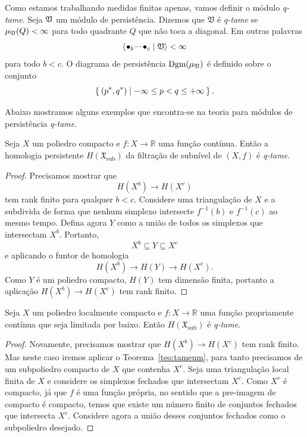 Como estamos trabalhando medidas finitas apenas, vamos definir o módulo \textit{q-tame}. Seja 
$\mathfrak{V}$ um módulo de persistência. Dizemos que $\mathfrak{V}$ é \textit{q-tame} se 
$\mu_{\mathfrak{V}}(Q) < \infty$ para todo quadrante $Q$ que não toca a diagonal. Em outras palavras
\begin{equation*}
    \innerproduct{\qon{b} \qem \qon{c} \mid \frakv} < \infty
\end{equation*}
para todo $b < c$. O diagrama de persistência $\text{Dgm}(\mu_{\mathfrak{V}})$ é definido sobre o conjunto
\begin{equation*}
    \Set{(p^*, q^*) | -\infty \leq p < q \leq + \infty}.
\end{equation*}

Abaixo mostramos alguns exemplos que encontra-se na teoria para módulos de persistência \textit{q-tame}.

\begin{teo}\label{teo:tameum}
Seja $X$ um poliedro compacto e $f \colon X \to \mathbb{R}$ uma função contínua. Então a homologia
persistente $H(\mathfrak{X}_{\text{sub}})$ da filtração de subnível de $(X,f)$ é \textit{q-tame}. 
\end{teo}
\begin{proof}
Precisamos mostrar que 
\begin{equation*}
    H(X^b) \to H(X^c) 
\end{equation*}
tem rank finito para qualquer $b < c$. Considere uma triangulação de $X$ e a subdivida de forma que 
nenhum simplexo intersecte $f^{-1}(b)$ e $f^{-1}(c)$ ao mesmo tempo. Defina agora $Y$ como a união
de todos os simplexos que intersectam $X^b$. Portanto, 
\begin{equation*}
    X^b \subseteq Y \subseteq X^c
\end{equation*} 
e aplicando o funtor de homologia
\begin{equation*}
    H(X^b) \longrightarrow H(Y) \longrightarrow H(X^c).
\end{equation*}
Como $Y$ é um poliedro compacto, $H(Y)$ tem dimensão finita, portanto a aplicação $H(X^b) \to H(X^c)$ 
tem rank finito. 
\end{proof}

\begin{cor}\label{teo:tamedois}
Seja $X$ um poliedro localmente compacto e $f \colon X \to \mathbb{R}$ uma função propriamente contínua
que seja limitada por baixo. Então $H(\mathfrak{X}_{\text{sub}})$ é \textit{q-tame}.
\end{cor}
\begin{proof}
Novamente, precisamos mostrar que $H(X^b) \to H(X^c)$ tem rank finito. Mas neste caso iremos aplicar
o Teorema~\ref{teo:tameum}, para tanto precisamos de um subpoliedro compacto de $X$ que contenha $X^c$. 
Seja uma triangulação local finita de $X$ e considere os simplexos fechados que intersectam $X^c$. 
Como $X^c$ é compacto, já que $f$ é uma função própria, no sentido que a pre-imagem de compacto é compacto,
temos que existe um número finito de conjuntos fechados que intersecta $X^c$. Considere agora a união
desses conjuntos fechados como o subpoliedro desejado. 
\end{proof}

